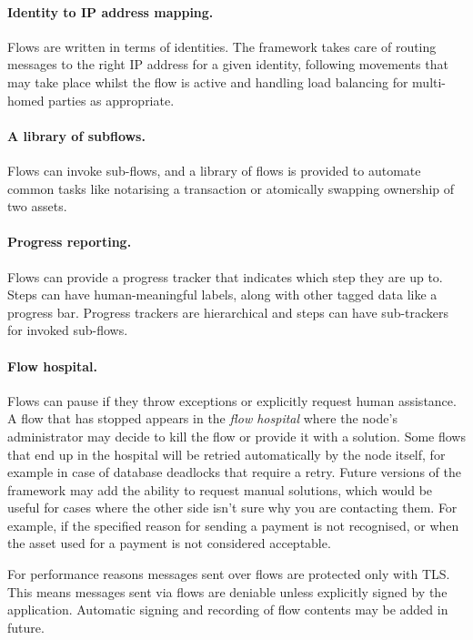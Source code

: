 \documentclass{article}
\begin{document}
\paragraph{Identity to IP address mapping.}Flows are written in terms of identities. The framework takes care of
routing messages to the right IP address for a given identity, following movements that may take place whilst the
flow is active and handling load balancing for multi-homed parties as appropriate.

\paragraph{A library of subflows.}Flows can invoke sub-flows, and a library of flows is provided to automate common
tasks like notarising a transaction or atomically swapping ownership of two assets.

\paragraph{Progress reporting.}Flows can provide a progress tracker that indicates which step they are up to. Steps
can have human-meaningful labels, along with other tagged data like a progress bar. Progress trackers are
hierarchical and steps can have sub-trackers for invoked sub-flows.

\paragraph{Flow hospital.}Flows can pause if they throw exceptions or explicitly request human assistance. A flow
that has stopped appears in the \emph{flow hospital} where the node's administrator may decide to kill the flow or
provide it with a solution. Some flows that end up in the hospital will be retried automatically by the node
itself, for example in case of database deadlocks that require a retry. Future versions of the framework may add
the ability to request manual solutions, which would be useful for cases where the other side isn't sure why
you are contacting them. For example, if the specified reason for sending a payment is not recognised, or
when the asset used for a payment is not considered acceptable.

For performance reasons messages sent over flows are protected only with TLS. This means messages sent via flows
are deniable unless explicitly signed by the application. Automatic signing and recording of flow contents may be
added in future.
\end{document}
